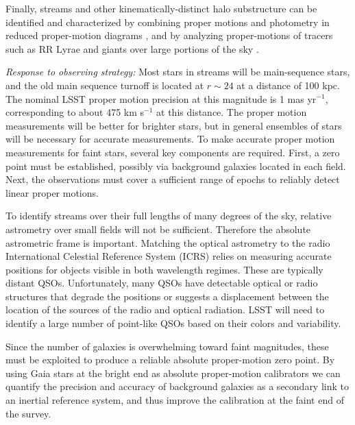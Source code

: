 Finally, streams and other kinematically-distinct halo substructure
can be identified and characterized by combining proper motions and 
photometry in reduced proper-motion diagrams \citep[e.g.,][]{carlin12}, 
and by analyzing proper-motions of tracers such as 
RR Lyrae and giants over large portions of the sky \citep[e.g.,][]{casettidinescu15}.

{\it Response to observing strategy:} Most stars in streams will be main-sequence stars, and the old main sequence turnoff  is located at $r\sim24$ at a distance of 100 kpc.
The nominal LSST proper motion precision at this magnitude is 1 mas yr$^{-1}$, corresponding to about 475 km s$^{-1}$ at this distance. The proper motion
measurements will be better for brighter stars, but in general ensembles of stars will be necessary for accurate measurements. To make accurate proper motion measurements for faint stars, several key components are required. First, a zero point must be established, possibly via background galaxies located in each field. Next, the observations must cover a sufficient range of epochs to reliably detect linear proper motions.

To identify streams over their full lengths of many degrees of the sky, relative astrometry over small fields will not be sufficient. Therefore the absolute astrometric frame is important. Matching the optical astrometry to the radio International Celestial Reference System (ICRS) relies on measuring accurate positions for objects visible in both wavelength regimes.
These are typically distant QSOs. Unfortunately, many QSOs have detectable optical or radio structures that degrade the positions or suggests a displacement between the location of the sources of the radio and optical radiation. LSST will need to identify a large number of point-like QSOs based on their colors and variability.

Since the number of galaxies is overwhelming toward faint magnitudes,
these must be exploited to produce a reliable absolute 
proper-motion zero point. By using Gaia stars at the bright end
as absolute proper-motion calibrators we can quantify the precision 
and accuracy of background galaxies as a secondary link to an inertial reference system, and thus improve the calibration at the faint end of the survey.


